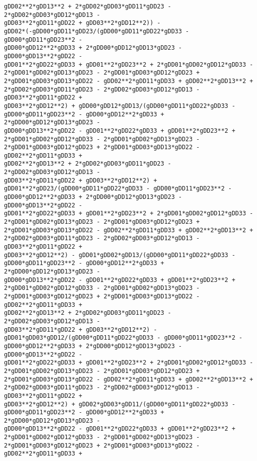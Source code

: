 \documentclass[landscape,letterpaper,10pt,english]{article}
\begin{document}
\begin{Verbatim}[commandchars=\\\{\}]
gDD02**2*gDD13**2 + 2*gDD02*gDD03*gDD11*gDD23 - 2*gDD02*gDD03*gDD12*gDD13 -
gDD03**2*gDD11*gDD22 + gDD03**2*gDD12**2)) -
gDD02*(-gDD00*gDD11*gDD23/(gDD00*gDD11*gDD22*gDD33 - gDD00*gDD11*gDD23**2 -
gDD00*gDD12**2*gDD33 + 2*gDD00*gDD12*gDD13*gDD23 - gDD00*gDD13**2*gDD22 -
gDD01**2*gDD22*gDD33 + gDD01**2*gDD23**2 + 2*gDD01*gDD02*gDD12*gDD33 -
2*gDD01*gDD02*gDD13*gDD23 - 2*gDD01*gDD03*gDD12*gDD23 +
2*gDD01*gDD03*gDD13*gDD22 - gDD02**2*gDD11*gDD33 + gDD02**2*gDD13**2 +
2*gDD02*gDD03*gDD11*gDD23 - 2*gDD02*gDD03*gDD12*gDD13 - gDD03**2*gDD11*gDD22 +
gDD03**2*gDD12**2) + gDD00*gDD12*gDD13/(gDD00*gDD11*gDD22*gDD33 -
gDD00*gDD11*gDD23**2 - gDD00*gDD12**2*gDD33 + 2*gDD00*gDD12*gDD13*gDD23 -
gDD00*gDD13**2*gDD22 - gDD01**2*gDD22*gDD33 + gDD01**2*gDD23**2 +
2*gDD01*gDD02*gDD12*gDD33 - 2*gDD01*gDD02*gDD13*gDD23 -
2*gDD01*gDD03*gDD12*gDD23 + 2*gDD01*gDD03*gDD13*gDD22 - gDD02**2*gDD11*gDD33 +
gDD02**2*gDD13**2 + 2*gDD02*gDD03*gDD11*gDD23 - 2*gDD02*gDD03*gDD12*gDD13 -
gDD03**2*gDD11*gDD22 + gDD03**2*gDD12**2) +
gDD01**2*gDD23/(gDD00*gDD11*gDD22*gDD33 - gDD00*gDD11*gDD23**2 -
gDD00*gDD12**2*gDD33 + 2*gDD00*gDD12*gDD13*gDD23 - gDD00*gDD13**2*gDD22 -
gDD01**2*gDD22*gDD33 + gDD01**2*gDD23**2 + 2*gDD01*gDD02*gDD12*gDD33 -
2*gDD01*gDD02*gDD13*gDD23 - 2*gDD01*gDD03*gDD12*gDD23 +
2*gDD01*gDD03*gDD13*gDD22 - gDD02**2*gDD11*gDD33 + gDD02**2*gDD13**2 +
2*gDD02*gDD03*gDD11*gDD23 - 2*gDD02*gDD03*gDD12*gDD13 - gDD03**2*gDD11*gDD22 +
gDD03**2*gDD12**2) - gDD01*gDD02*gDD13/(gDD00*gDD11*gDD22*gDD33 -
gDD00*gDD11*gDD23**2 - gDD00*gDD12**2*gDD33 + 2*gDD00*gDD12*gDD13*gDD23 -
gDD00*gDD13**2*gDD22 - gDD01**2*gDD22*gDD33 + gDD01**2*gDD23**2 +
2*gDD01*gDD02*gDD12*gDD33 - 2*gDD01*gDD02*gDD13*gDD23 -
2*gDD01*gDD03*gDD12*gDD23 + 2*gDD01*gDD03*gDD13*gDD22 - gDD02**2*gDD11*gDD33 +
gDD02**2*gDD13**2 + 2*gDD02*gDD03*gDD11*gDD23 - 2*gDD02*gDD03*gDD12*gDD13 -
gDD03**2*gDD11*gDD22 + gDD03**2*gDD12**2) -
gDD01*gDD03*gDD12/(gDD00*gDD11*gDD22*gDD33 - gDD00*gDD11*gDD23**2 -
gDD00*gDD12**2*gDD33 + 2*gDD00*gDD12*gDD13*gDD23 - gDD00*gDD13**2*gDD22 -
gDD01**2*gDD22*gDD33 + gDD01**2*gDD23**2 + 2*gDD01*gDD02*gDD12*gDD33 -
2*gDD01*gDD02*gDD13*gDD23 - 2*gDD01*gDD03*gDD12*gDD23 +
2*gDD01*gDD03*gDD13*gDD22 - gDD02**2*gDD11*gDD33 + gDD02**2*gDD13**2 +
2*gDD02*gDD03*gDD11*gDD23 - 2*gDD02*gDD03*gDD12*gDD13 - gDD03**2*gDD11*gDD22 +
gDD03**2*gDD12**2) + gDD02*gDD03*gDD11/(gDD00*gDD11*gDD22*gDD33 -
gDD00*gDD11*gDD23**2 - gDD00*gDD12**2*gDD33 + 2*gDD00*gDD12*gDD13*gDD23 -
gDD00*gDD13**2*gDD22 - gDD01**2*gDD22*gDD33 + gDD01**2*gDD23**2 +
2*gDD01*gDD02*gDD12*gDD33 - 2*gDD01*gDD02*gDD13*gDD23 -
2*gDD01*gDD03*gDD12*gDD23 + 2*gDD01*gDD03*gDD13*gDD22 - gDD02**2*gDD11*gDD33 +

\end{Verbatim}
\end{document}
